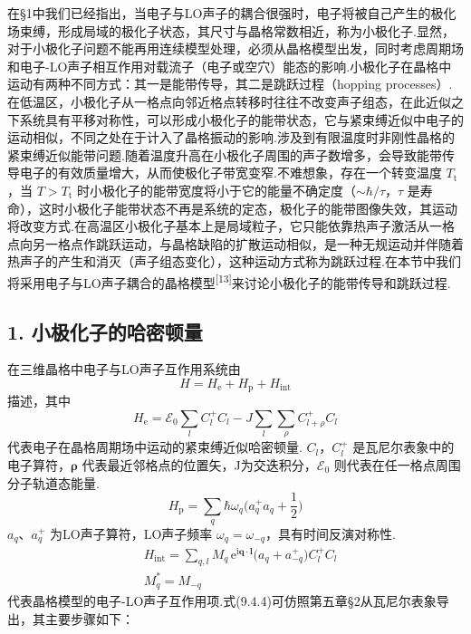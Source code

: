 在§1中我们已经指出，当电子与LO声子的耦合很强时，电子将被自己产生的极化场束缚，形成局域的极化子状态，其尺寸与晶格常数相近，称为小极化子.显然，对于小极化子问题不能再用连续模型处理，必须从晶格模型出发，同时考虑周期场和电子-LO声子相互作用对载流子（电子或空穴）能态的影响.小极化子在晶格中运动有两种不同方式：其一是能带传导，其二是跳跃过程（hopping processes）.在低温区，小极化子从一格点向邻近格点转移时往往不改变声子组态，在此近似之下系统具有平移对称性，可以形成小极化子的能带状态，它与紧束缚近似中电子的运动相似，不同之处在于计入了晶格振动的影响.涉及到有限温度时非刚性晶格的紧束缚近似能带问题.随着温度升高在小极化子周围的声子数增多，会导致能带传导电子的有效质量增大，从而使极化子带宽变窄.不难想象，存在一个转变温度 $T_{\mathrm t}$，当 $T>T_{\mathrm t}$ 时小极化子的能带宽度将小于它的能量不确定度（$\sim\hbar/\tau$，$\tau$ 是寿命），这时小极化子能带状态不再是系统的定态，极化子的能带图像失效，其运动将改变方式.在高温区小极化子基本上是局域粒子，它只能依靠热声子激活从一格点向另一格点作跳跃运动，与晶格缺陷的扩散运动相似，是一种无规运动并伴随着热声子的产生和消灭（声子组态变化），这种运动方式称为跳跃过程.在本节中我们将采用电子与LO声子耦合的晶格模型\textsuperscript{[13]}来讨论小极化子的能带传导和跳跃过程.

\subsection*{1. 小极化子的哈密顿量}

在三维晶格中电子与LO声子互作用系统由
\begin{equation}
  H=H_{\mathrm e}+H_{\mathrm p}+H_{\mathrm{int}}
\end{equation}
描述，其中
\begin{equation}
  H_{\mathrm e}=\mathscr{E}_{0}\sum_{l}C_{l}^{+}C_{l}
  -J\sum_{l}\sum_{\rho}C_{l+\rho}^{+}C_{l}
\end{equation}
代表电子在晶格周期场中运动的紧束缚近似哈密顿量. $C_{l}$，$C_{l}^{+}$ 是瓦尼尔表象中的电子算符，$\boldsymbol{\rho}$ 代表最近邻格点的位置矢，J为交迭积分，$\mathscr{E}_{0}$ 则代表在任一格点周围分子轨道态能量.
\begin{equation}
  H_{\mathrm p}=\sum_{q}\hbar\omega_{q}
  \biggl(a_{q}^{+}a_{q}+\frac{1}{2}\biggr)
\end{equation}
$a_{q}$、$a_{q}^{+}$ 为LO声子算符，LO声子频率 $\omega_{q}=\omega_{-q}$，具有时间反演对称性.
\begin{equation}
\begin{aligned}
  &H_{\mathrm{int}}=\sum_{q,l}M_{q}\,\mathrm{e}^{\mathrm{i}\boldsymbol{q}\cdot\boldsymbol{l}}
  \bigl(a_{q}+a_{-q}^{+}\bigr)C_{l}^{+}C_{l}\\
  &M_{q}^{*}=M_{-q}
\end{aligned}
\end{equation}
代表晶格模型的电子-LO声子互作用项.式(9.4.4)可仿照第五章§2从瓦尼尔表象导出，其主要步骤如下：

